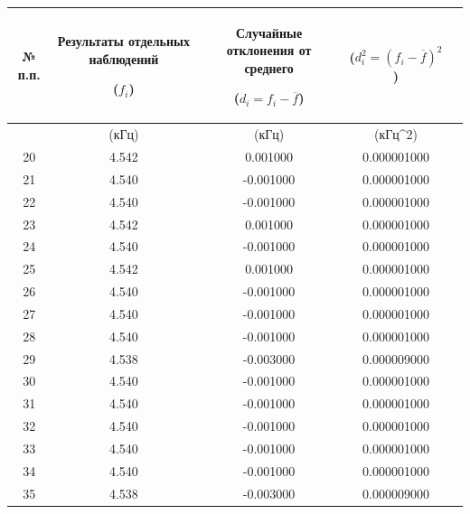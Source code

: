 \begin{center}
\begin{tabular}{|c|c|c|c|c|}
\hline
\begin{minipage}{7mm}
    № п.п. 
\end{minipage}&
\begin{minipage}{5cm}
\begin{center}
    Результаты отдельных наблюдений 
    
    ($f_i$)
\end{center}
\end{minipage} &
\begin{minipage}{5cm}
\begin{center}
    Случайные отклонения от среднего
    
    ($d_i = f_i - \overline{f}$)
\end{center}
\end{minipage} &
\begin{minipage}{5cm}
\begin{center}
    ($d_i^2 = (f_i - \overline{f})^2$)
\end{center}
\end{minipage}\\
\hline
{}&(кГц)&(кГц)&(кГц^2)\\
\hline
20 &	4.542  &   0.001000  &  0.000001000 \\
21 &	4.540  &  -0.001000  &  0.000001000 \\
22 &	4.540  &  -0.001000  &  0.000001000 \\
23 &	4.542  &   0.001000  &  0.000001000 \\
24 &	4.540  &  -0.001000  &  0.000001000 \\
25 &	4.542  &   0.001000  &  0.000001000 \\
26 &	4.540  &  -0.001000  &  0.000001000 \\
27 &	4.540  &  -0.001000  &  0.000001000 \\
28 &	4.540  &  -0.001000  &  0.000001000 \\
29 &	4.538  &  -0.003000  &  0.000009000 \\
30 &	4.540  &  -0.001000  &  0.000001000 \\
31 &	4.540  &  -0.001000  &  0.000001000 \\
32 &	4.540  &  -0.001000  &  0.000001000 \\
33 &	4.540  &  -0.001000  &  0.000001000 \\
34 &	4.540  &  -0.001000  &  0.000001000 \\
35 &	4.538  &  -0.003000  &  0.000009000 \\

\end{tabular}
\end{center}
